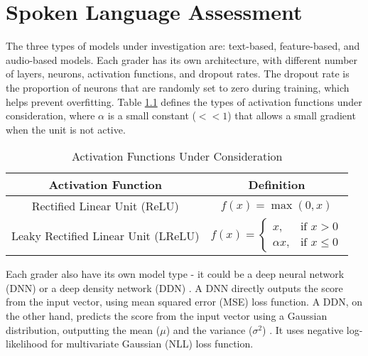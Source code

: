 \chapter{Spoken Language Assessment} \label{chap:graders}

The three types of models under investigation are: text-based, feature-based, and audio-based models. Each grader has its own architecture, with different number of layers, neurons, activation functions, and dropout rates. The dropout rate is the proportion of neurons that are randomly set to zero during training, which helps prevent overfitting. Table \ref{activation functions} defines the types of activation functions under consideration, where $\alpha$ is a small constant ($<<1$) that allows a small gradient when the unit is not active.

\begin{table}[H]
    \centering
    \begin{tabular}{|c|c|}
        \hline
        \textbf{Activation Function}                                                             & \textbf{Definition}                     \\ \hline
        Rectified Linear Unit (ReLU) \nomenclature[Z]{ReLU}{Rectified Linear Unit}               & $f(x) = \max(0, x)$                     \\ \hline
        Leaky Rectified Linear Unit (LReLU) \nomenclature[Z]{LReLU}{Leaky Rectified Linear Unit} & $f(x) = \begin{cases}
                                                                                                                   x,        & \text{if } x > 0    \\
                                                                                                                   \alpha x, & \text{if } x \leq 0
                                                                                                               \end{cases}$ \\ \hline
    \end{tabular}
    \caption{Activation Functions Under Consideration}
    \label{activation functions}
\end{table}

Each grader also have its own model type - it could be a deep neural network (DNN)  or a deep density network (DDN) . A DNN directly outputs the score from the input vector, using mean squared error (MSE)  loss function. A DDN, on the other hand, predicts the score from the input vector using a Gaussian distribution, outputting the mean ($\mu$)  and the variance ($\sigma^2$) . It uses negative log-likelihood for multivariate Gaussian (NLL)  loss function.


